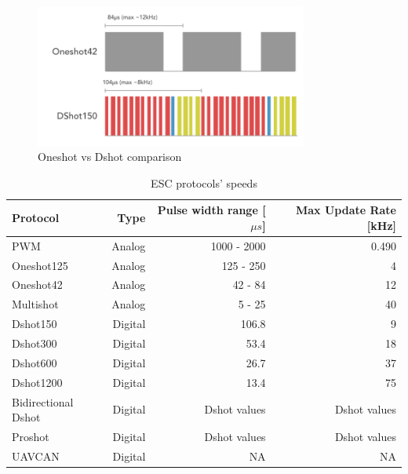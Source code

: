 \begin{figure}
    \centering
    \includegraphics[width=0.8\textwidth]{images/oneshot_dshot.png}
    \caption{Oneshot vs Dshot comparison \cite{BackyardRobotics2018}}
    \label{fig:oneshot_dshot}
\end{figure}

\begin{table}
\begin{center}
 \caption{ESC protocols' speeds}\vspace{1ex}
 \label{tab:tab_escs}
 \begin{tabular}{l|rrr}
 \hline
Protocol & Type & Pulse width range [$\mu s$] & Max Update Rate [kHz] \\ \hline \hline
PWM                 & Analog & 1000 - 2000  & 0.490\\
Oneshot125          & Analog & 125 - 250    & 4\\
Oneshot42           & Analog & 42 - 84      & 12\\
Multishot           & Analog & 5 - 25       & 40\\
Dshot150            & Digital & 106.8        & 9\\
Dshot300            & Digital & 53.4         & 18\\
Dshot600            & Digital & 26.7         & 37\\
Dshot1200           & Digital & 13.4         & 75\\
Bidirectional Dshot & Digital & Dshot values & Dshot values \\
Proshot             & Digital & Dshot values & Dshot values\\
UAVCAN              & Digital & NA           & NA\\
 \end{tabular}
\end{center}
\end{table}


